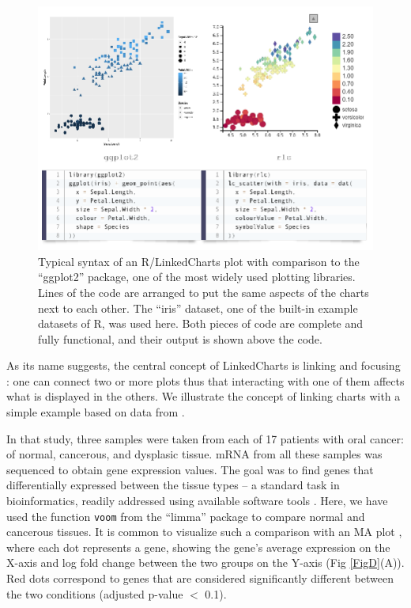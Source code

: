 \documentclass[twocolumn,10pt]{article}
\begin{document}
\begin{figure}[t]
	\includegraphics[width=\textwidth]{FigB/figB.png}
	\caption{Typical syntax of an R/LinkedCharts plot with comparison to the ``ggplot2'' \citep{wickham_2016} package, one of the most widely used plotting libraries. Lines of the code are arranged to put the same aspects of the charts next to each other. The ``iris'' dataset, one of the built-in example datasets of R, was used here. Both pieces of code are complete and fully functional, and their output is shown above the code.}
	\label{FigB}
\end{figure}

As its name suggests, the central concept of LinkedCharts is linking and focusing \citep{buja_1991}: one can connect two or more plots thus that interacting with one of them affects what is displayed in the others. We illustrate the concept of linking charts with a simple example based on data from \citet{conway_2015}.

In that study, three samples were taken from each of 17 patients with oral cancer: of normal, cancerous, and dysplasic tissue. mRNA from all these samples was sequenced to obtain gene expression values. The goal was to find genes that differentially expressed between the tissue types -- a standard task in bioinformatics, readily addressed using available software tools \citep{ritchie_2015, love_2014}. Here, we have used the function \texttt{voom} from the ``limma'' package \citep{law_2014} to compare normal and cancerous tissues. It is common to visualize such a comparison with an MA plot \citep{dudoit_2002}, where each dot represents a gene, showing the gene's average expression on the X-axis and log fold change between the two groups on the Y-axis (Fig \ref{FigD}(A)). Red dots correspond to genes that are considered significantly different between the two conditions (adjusted p-value $<$ 0.1). 
\end{document}
